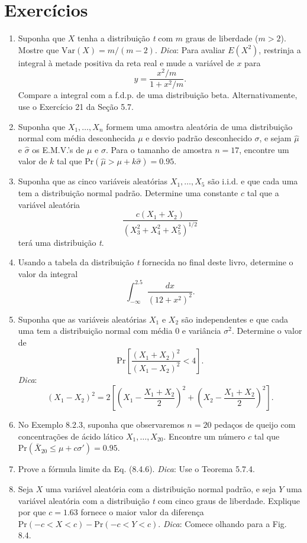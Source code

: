 \section*{Exercícios}

\begin{enumerate}
    \item Suponha que $X$ tenha a distribuição \textit{t} com $m$ graus de liberdade ($m > 2$). Mostre que $\text{Var}(X) = m/(m-2)$. \textit{Dica}: Para avaliar $E(X^2)$, restrinja a integral à metade positiva da reta real e mude a variável de $x$ para
    $$ y = \frac{x^2/m}{1 + x^2/m}. $$
    Compare a integral com a f.d.p. de uma distribuição beta. Alternativamente, use o Exercício 21 da Seção 5.7.

    \item Suponha que $X_1, \dots, X_n$ formem uma amostra aleatória de uma distribuição normal com média desconhecida $\mu$ e desvio padrão desconhecido $\sigma$, e sejam $\hat{\mu}$ e $\hat{\sigma}$ os E.M.V.'s de $\mu$ e $\sigma$. Para o tamanho de amostra $n=17$, encontre um valor de $k$ tal que $\text{Pr}(\hat{\mu} > \mu + k\hat{\sigma}) = 0.95$.
    
    \item Suponha que as cinco variáveis aleatórias $X_1, \dots, X_5$ são i.i.d. e que cada uma tem a distribuição normal padrão. Determine uma constante $c$ tal que a variável aleatória
    $$ \frac{c(X_1 + X_2)}{(X_3^2 + X_4^2 + X_5^2)^{1/2}} $$
    terá uma distribuição \textit{t}.

    \item Usando a tabela da distribuição \textit{t} fornecida no final deste livro, determine o valor da integral
    $$ \int_{-\infty}^{2.5} \frac{dx}{(12 + x^2)^2}. $$
    
    \item Suponha que as variáveis aleatórias $X_1$ e $X_2$ são independentes e que cada uma tem a distribuição normal com média 0 e variância $\sigma^2$. Determine o valor de
    $$ \text{Pr}\left[\frac{(X_1 + X_2)^2}{(X_1 - X_2)^2} < 4\right]. $$
    \textit{Dica}:
    $$ (X_1 - X_2)^2 = 2\left[ \left(X_1 - \frac{X_1 + X_2}{2}\right)^2 + \left(X_2 - \frac{X_1 + X_2}{2}\right)^2 \right]. $$
    
    \item No Exemplo 8.2.3, suponha que observaremos $n=20$ pedaços de queijo com concentrações de ácido lático $X_1, \dots, X_{20}$. Encontre um número $c$ tal que $\text{Pr}(\bar{X}_{20} \le \mu + c\sigma') = 0.95$.
    
    \item Prove a fórmula limite da Eq. (8.4.6). \textit{Dica}: Use o Teorema 5.7.4.
    
    \item Seja $X$ uma variável aleatória com a distribuição normal padrão, e seja $Y$ uma variável aleatória com a distribuição \textit{t} com cinco graus de liberdade. Explique por que $c=1.63$ fornece o maior valor da diferença $\text{Pr}(-c < X < c) - \text{Pr}(-c < Y < c)$. \textit{Dica}: Comece olhando para a Fig. 8.4.

\end{enumerate}